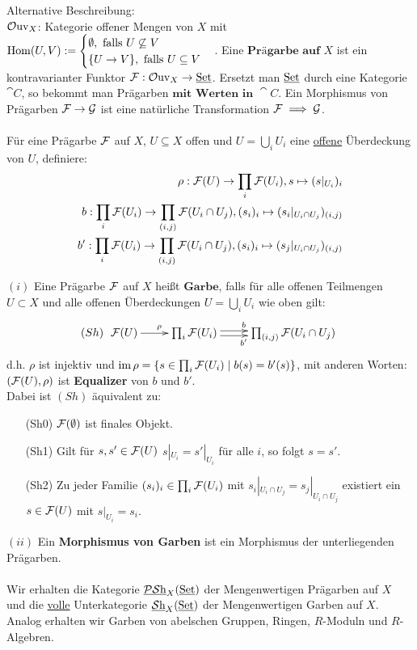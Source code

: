 Alternative Beschreibung:\\
$\operatorname{\mathcal{O}uv}_{X}$: Kategorie offener Mengen von $X$ mit $\operatorname{\mathrm{Hom}}(U, V) := \begin{cases} \emptyset, \text{ falls } U \not\subseteq V \\ \{ U \to V\}, \text{ falls } U \subseteq V \end{cases}$.
Eine $\textbf{Prägarbe auf }X$ ist ein kontravarianter Funktor $\mathcal{F} : \operatorname{\mathcal{O}uv}_{X} \to \operatorname{\underline{Set}}$. Ersetzt man $\operatorname{\underline{Set}}$ durch eine Kategorie $\cat{C}$, so bekommt man Prägarben $\textbf{mit Werten in } \cat{C}$.
Ein Morphismus von Prägarben $\mathcal{F} \to \mathcal{G}$ ist eine natürliche Transformation $\mathcal{F} \implies \mathcal{G}$.\\
\\
Für eine Prägarbe $\mathcal{F}$ auf $X$, $U \subseteq X$ offen und $U = \bigcup_{i} U_{i}$ eine \underline{offene} Überdeckung von $U$, definiere:
\begin{align}
\rho : \mathcal{F}(U) \to \prod_{i}\mathcal{F}(U_{i}), s \mapsto (s|_{U_{i}})_{i}\\
b : \prod_{i} \mathcal{F}(U_{i}) \to \prod_{(i, j)} \mathcal{F}(U_{i} \cap U_{j}), (s_{i})_{i} \mapsto (s_{i}|_{U_{i} \cap U_{j}})_{(i,j)}\\
b' : \prod_{i} \mathcal{F}(U_{i}) \to \prod_{(i, j)} \mathcal{F}(U_{i} \cap U_{j}), (s_{i})_{i} \mapsto (s_{j}|_{U_{i} \cap U_{j}})_{(i,j)}
\end{align}

\begin{defn}
\label{def:garbe}
$(i)$ Eine Prägarbe $\mathcal{F}$ auf $X$ heißt $\textbf{Garbe}$, falls für alle offenen Teilmengen $U \subset X$ und alle offenen Überdeckungen $U = \bigcup_{i} U_{i}$ wie oben gilt:\\
\[
(Sh)\ \xymatrix{\sheaf{F}(U)\ar^{\rho}@{->}[r] & \prod_{i}\sheaf{F}(U_{i}) \ar^{b}@<+.5ex>[r] \ar_{b'}@<-.5ex>[r] & \prod_{(i, j)}\sheaf{F}(U_{i} \cap U_{j})}
\]d.h. $\rho$ ist injektiv und $\operatorname{\mathrm{im}}\rho = \{ s \in \prod_{i} \mathcal{F}(U_{i}) \mid b(s) = b'(s)\}$, mit anderen Worten: $(\mathcal{F}(U), \rho)$ ist \textbf{Equalizer} von $b$ und $b'$.\\
Dabei ist $(Sh)$ äquivalent zu:
\begin{enumerate}
	\item[(Sh0)]   $\mathcal{F}(\emptyset)$ ist finales Objekt.
	\item[(Sh1)] Gilt für $s,s' \in \mathcal{F}(U)$  $s|_{U_{i}} = s'|_{U_{i}}$ für alle $i$, so folgt $s = s'$.
	\item[(Sh2)] Zu jeder Familie $(s_{i})_{i} \in \prod_{i}\mathcal{F}(U_{i})$ mit $s_{i}|_{U_{i} \cap U_{j}} = s_{j}|_{U_{i} \cap U_{j}}$ existiert ein $s \in \mathcal{F}(U)$ mit $s|_{U_{i}} = s_{i}$.
\end{enumerate}
$(ii)$ Ein \textbf{Morphismus von Garben} ist ein Morphismus der unterliegenden Prägarben.\\
\\
Wir erhalten die Kategorie $\operatorname{\underline{\mathcal{PS}h}}_{X}(\operatorname{\underline{Set}})$ der Mengenwertigen Prägarben auf $X$ und die \underline{volle} Unterkategorie $\operatorname{\underline{\mathcal{S}h}}_{X}(\operatorname{\underline{Set}})$ der Mengenwertigen Garben auf $X$.
Analog erhalten wir Garben von abelschen Gruppen, Ringen, $R$-Moduln und $R$-Algebren.
\end{defn}


